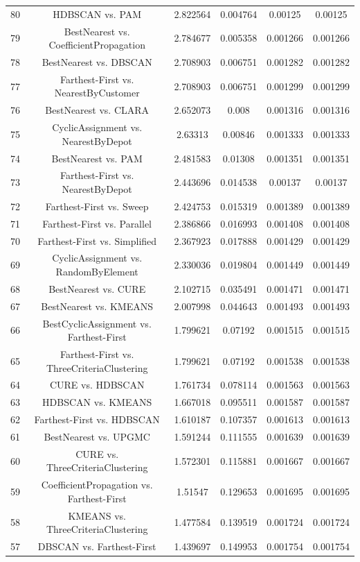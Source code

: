 \documentclass[a4paper,10pt]{article}
\begin{document}
\begin{landscape}
\begin{table}[!htp]
\begin{tabular}{cccccc}
80&HDBSCAN vs. PAM&2.822564&0.004764&0.00125&0.00125\\
79&BestNearest vs. CoefficientPropagation&2.784677&0.005358&0.001266&0.001266\\
78&BestNearest vs. DBSCAN&2.708903&0.006751&0.001282&0.001282\\
77&Farthest-First vs. NearestByCustomer&2.708903&0.006751&0.001299&0.001299\\
76&BestNearest vs. CLARA&2.652073&0.008&0.001316&0.001316\\
75&CyclicAssignment vs. NearestByDepot&2.63313&0.00846&0.001333&0.001333\\
74&BestNearest vs. PAM&2.481583&0.01308&0.001351&0.001351\\
73&Farthest-First vs. NearestByDepot&2.443696&0.014538&0.00137&0.00137\\
72&Farthest-First vs. Sweep&2.424753&0.015319&0.001389&0.001389\\
71&Farthest-First vs. Parallel&2.386866&0.016993&0.001408&0.001408\\
70&Farthest-First vs. Simplified&2.367923&0.017888&0.001429&0.001429\\
69&CyclicAssignment vs. RandomByElement&2.330036&0.019804&0.001449&0.001449\\
68&BestNearest vs. CURE&2.102715&0.035491&0.001471&0.001471\\
67&BestNearest vs. KMEANS&2.007998&0.044643&0.001493&0.001493\\
66&BestCyclicAssignment vs. Farthest-First&1.799621&0.07192&0.001515&0.001515\\
65&Farthest-First vs. ThreeCriteriaClustering&1.799621&0.07192&0.001538&0.001538\\
64&CURE vs. HDBSCAN&1.761734&0.078114&0.001563&0.001563\\
63&HDBSCAN vs. KMEANS&1.667018&0.095511&0.001587&0.001587\\
62&Farthest-First vs. HDBSCAN&1.610187&0.107357&0.001613&0.001613\\
61&BestNearest vs. UPGMC&1.591244&0.111555&0.001639&0.001639\\
60&CURE vs. ThreeCriteriaClustering&1.572301&0.115881&0.001667&0.001667\\
59&CoefficientPropagation vs. Farthest-First&1.51547&0.129653&0.001695&0.001695\\
58&KMEANS vs. ThreeCriteriaClustering&1.477584&0.139519&0.001724&0.001724\\
57&DBSCAN vs. Farthest-First&1.439697&0.149953&0.001754&0.001754\\

\end{tabular}
\end{table}
\end{landscape}
\end{document}
